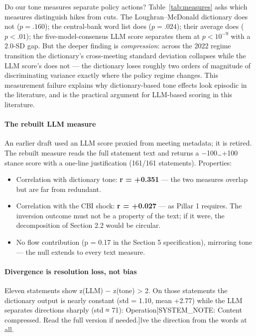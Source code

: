 \documentclass[11pt]{article}
\providecommand{\tightlist}{\setlength{\itemsep}{0pt}\setlength{\parskip}{0pt}}
\begin{document}
Do our tone measures separate policy actions? Table~\ref{tab:measures} asks
which measures distinguish hikes from cuts. The Loughran--McDonald dictionary
does not ($p=.160$); the central-bank word list does ($p=.024$); their average
does ($p<.01$); the five-model-consensus LLM score separates them at
$p<10^{-9}$ with a $2.0$-SD gap. But the deeper finding is
\emph{compression}: across the 2022 regime transition the dictionary's
cross-meeting standard deviation collapses while the LLM score's does not ---
the dictionary loses roughly two orders of magnitude of discriminating
variance exactly where the policy regime changes. This measurement failure
explains why dictionary-based tone effects look episodic in the literature,
and is the practical argument for LLM-based scoring in this literature.

\paragraph{The rebuilt LLM measure}\label{the-rebuilt-llm-measure}

An earlier draft used an LLM score proxied from meeting metadata; it is retired. The rebuilt measure reads the full statement text and returns a −100\ldots+100 stance score with a one-line justification (161/161 statements). Properties:

\begin{itemize}
\tightlist
\item
  Correlation with dictionary tone: \textbf{r = +0.351} --- the two measures overlap but are far from redundant.
\item
  Correlation with the CBI shock: \textbf{r = +0.027} --- as Pillar 1 requires. The inversion outcome must not be a property of the text; if it were, the decomposition of Section 2.2 would be circular.
\item
  No flow contribution (p = 0.17 in the Section 5 specification), mirroring tone --- the null extends to every text measure.
\end{itemize}

\paragraph{Divergence is resolution loss, not bias}\label{divergence-is-resolution-loss-not-bias}

Eleven statements show \textbar z(LLM) − z(tone)\textbar{} \textgreater{} 2. On those statements the dictionary output is nearly constant (std = 1.10, mean +2.77) while the LLM separates directions sharply (std ≈ 71): Operation{[}SYSTEM\_NOTE: Content compressed. Read the full version if needed.{]}lve the direction from the words at all.
\end{document}
